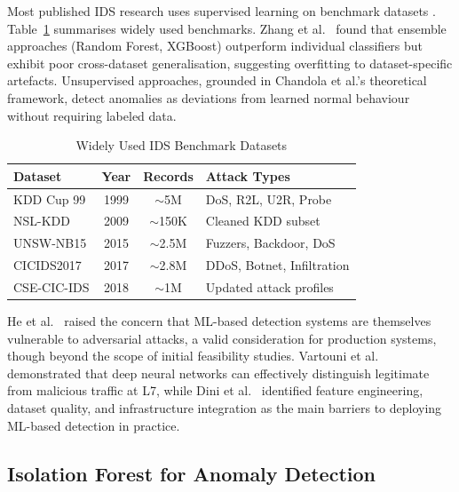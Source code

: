 \documentclass[conference]{IEEEtran}
\begin{document}
Most published IDS research uses supervised learning on benchmark datasets \cite{zhang2022comparative}. Table~\ref{tab:datasets} summarises widely used benchmarks. Zhang et al.\ \cite{zhang2022comparative} found that ensemble approaches (Random Forest, XGBoost) outperform individual classifiers but exhibit poor cross-dataset generalisation, suggesting overfitting to dataset-specific artefacts. Unsupervised approaches, grounded in Chandola et al.'s \cite{chandola2009anomaly} theoretical framework, detect anomalies as deviations from learned normal behaviour without requiring labeled data.

\begin{table}[!t]
\centering
\caption{Widely Used IDS Benchmark Datasets}
\label{tab:datasets}
\renewcommand{\arraystretch}{1.15}
\small
\begin{tabularx}{\columnwidth}{l|c|c|X}
\toprule
\textbf{Dataset} & \textbf{Year} & \textbf{Records} & \textbf{Attack Types} \\
\midrule
KDD Cup 99   & 1999 & $\sim$5M   & DoS, R2L, U2R, Probe \\
NSL-KDD      & 2009 & $\sim$150K & Cleaned KDD subset \\
UNSW-NB15    & 2015 & $\sim$2.5M & Fuzzers, Backdoor, DoS \\
CICIDS2017   & 2017 & $\sim$2.8M & DDoS, Botnet, Infiltration \\
CSE-CIC-IDS  & 2018 & $\sim$1M   & Updated attack profiles \\
\bottomrule
\end{tabularx}
\end{table}

He et al.\ \cite{he2023adversarial} raised the concern that ML-based detection systems are themselves vulnerable to adversarial attacks, a valid consideration for production systems, though beyond the scope of initial feasibility studies. Vartouni et al.\ \cite{vartouni2019leveraging} demonstrated that deep neural networks can effectively distinguish legitimate from malicious traffic at L7, while Dini et al.\ \cite{dini2023overview} identified feature engineering, dataset quality, and infrastructure integration as the main barriers to deploying ML-based detection in practice.

\subsection{Isolation Forest for Anomaly Detection}
\end{document}
